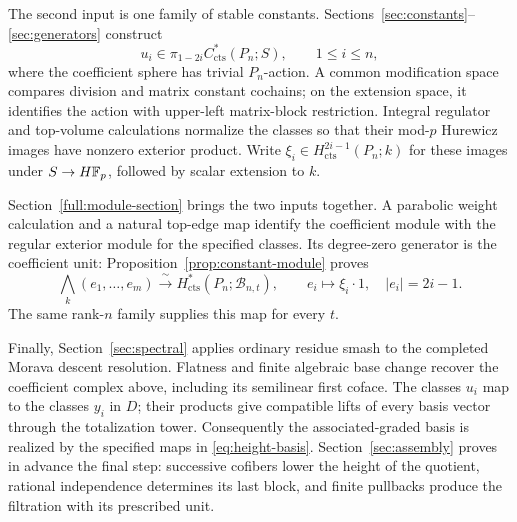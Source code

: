 The second input is one family of stable constants.
Sections~\ref{sec:constants}--\ref{sec:generators} construct
\[
u_i\in\pi_{1-2i}C^*_{\mathrm{cts}}(P_n;S),\qquad 1\leq i\leq n,
\]
where the coefficient sphere has trivial \(P_n\)-action. A common
modification space compares division and matrix constant cochains;
on the extension space, it identifies the action with upper-left
matrix-block restriction. Integral regulator and top-volume
calculations normalize the classes so that their mod-\(p\) Hurewicz
images have nonzero exterior product. Write
\(\xi_i\in H^{2i-1}_{\mathrm{cts}}(P_n;k)\) for these images
under \(S\to H\mathbb F_p\), followed by scalar extension to \(k\).

Section~\ref{full:module-section} brings the two inputs together.
A parabolic weight calculation and a natural top-edge map identify
the coefficient module with the regular exterior module for the
specified classes. Its degree-zero generator is the coefficient unit:
Proposition~\ref{prop:constant-module} proves
\[
\bigwedge_k(e_1,\ldots,e_m)
\xrightarrow{\;\sim\;}H^*_{\mathrm{cts}}(P_n;\mathcal B_{n,t}),
\qquad e_i\longmapsto\xi_i\cdot1,\quad |e_i|=2i-1.
\]
The same rank-\(n\) family supplies this map for every \(t\).

Finally, Section~\ref{sec:spectral} applies ordinary residue smash
to the completed Morava descent resolution. Flatness and finite
algebraic base change recover the coefficient complex above,
including its semilinear first coface. The classes \(u_i\) map to
the classes \(y_i\) in \(D\); their products give compatible lifts
of every basis vector through the totalization tower. Consequently
the associated-graded basis is realized by the specified maps in
\eqref{eq:height-basis}. Section~\ref{sec:assembly} proves in advance
the final step: successive cofibers lower the height of the quotient,
rational independence determines its last block, and finite pullbacks
produce the filtration with its prescribed unit.

